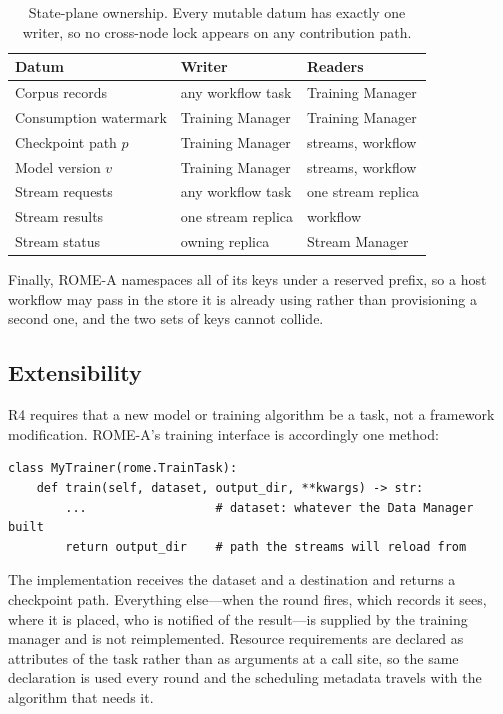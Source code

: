 \begin{table}[t]
  \centering
  \small
  \caption{State-plane ownership. Every mutable datum has exactly one writer, so
  no cross-node lock appears on any contribution path.}
  \label{tab:state}
  \begin{tabular}{@{}lll@{}}
    \toprule
    Datum & Writer & Readers \\
    \midrule
    Corpus records      & any workflow task & Training Manager \\
    Consumption watermark & Training Manager & Training Manager \\
    Checkpoint path $p$   & Training Manager & streams, workflow \\
    Model version $v$     & Training Manager & streams, workflow \\
    Stream requests       & any workflow task & one stream replica \\
    Stream results        & one stream replica & workflow \\
    Stream status         & owning replica    & Stream Manager \\
    \bottomrule
  \end{tabular}
\end{table}

Finally, ROME-A namespaces all of its keys under a reserved prefix, so a host
workflow may pass in the store it is already using rather than provisioning a
second one, and the two sets of keys cannot collide.

\subsection{Extensibility}
\label{sec:design:extensibility}

R4 requires that a new model or training algorithm be a task, not a framework
modification. ROME-A's training interface is accordingly one method:

\begin{lstlisting}[style=rome]
class MyTrainer(rome.TrainTask):
    def train(self, dataset, output_dir, **kwargs) -> str:
        ...                  # dataset: whatever the Data Manager built
        return output_dir    # path the streams will reload from
\end{lstlisting}

The implementation receives the dataset and a destination and returns a
checkpoint path. Everything else---when the round fires, which records it sees,
where it is placed, who is notified of the result---is supplied by the training
manager and is not reimplemented. Resource requirements are declared as
attributes of the task rather than as arguments at a call site, so the same
declaration is used every round and the scheduling metadata travels with the
algorithm that needs it.

